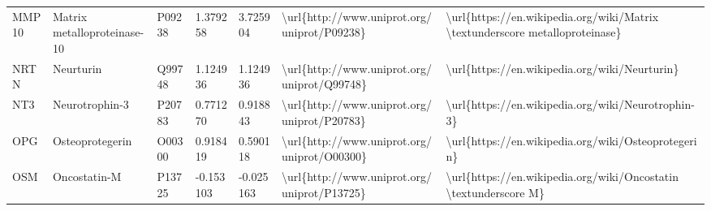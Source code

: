 \begin{table}[]
\begin{tabular}{lllllll}
\multicolumn{1}{l|}{MMP10}    & Matrix metalloproteinase-10                                   & P09238  & 1.379258           & 3.725904          & \textbackslash{}url\{http://www.uniprot.org/uniprot/P09238\} & \textbackslash{}url\{https://en.wikipedia.org/wiki/Matrix \textbackslash{}textunderscore metalloproteinase\}                                                                                                                                                                                       \\
\multicolumn{1}{l|}{NRTN}     & Neurturin                                                     & Q99748  & 1.124936           & 1.124936          & \textbackslash{}url\{http://www.uniprot.org/uniprot/Q99748\} & \textbackslash{}url\{https://en.wikipedia.org/wiki/Neurturin\}                                                                                                                                                                                                                                     \\
\multicolumn{1}{l|}{NT3}      & Neurotrophin-3                                                & P20783  & 0.771270           & 0.918843          & \textbackslash{}url\{http://www.uniprot.org/uniprot/P20783\} & \textbackslash{}url\{https://en.wikipedia.org/wiki/Neurotrophin-3\}                                                                                                                                                                                                                                \\
\multicolumn{1}{l|}{OPG}      & Osteoprotegerin                                               & O00300  & 0.918419           & 0.590118          & \textbackslash{}url\{http://www.uniprot.org/uniprot/O00300\} & \textbackslash{}url\{https://en.wikipedia.org/wiki/Osteoprotegerin\}                                                                                                                                                                                                                               \\
\multicolumn{1}{l|}{OSM}      & Oncostatin-M                                                  & P13725  & -0.153103          & -0.025163         & \textbackslash{}url\{http://www.uniprot.org/uniprot/P13725\} & \textbackslash{}url\{https://en.wikipedia.org/wiki/Oncostatin \textbackslash{}textunderscore M\}                                                                                                                                                                                                   \\

\end{tabular}
\end{table}
